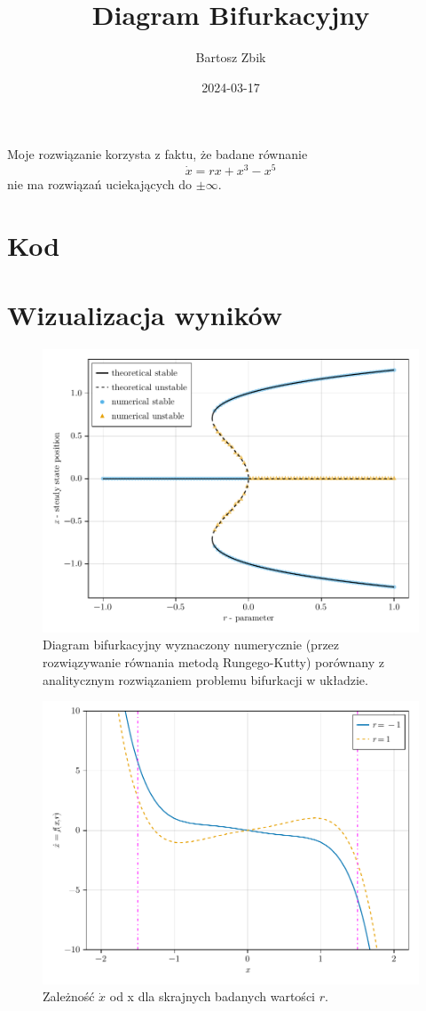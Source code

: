 \documentclass[12pt]{article}
\title{Diagram Bifurkacyjny}
\author{Bartosz Zbik}
\date{2024-03-17} %
\begin{document}
\maketitle %

\noindent Moje rozwiązanie korzysta z faktu, że badane równanie
\begin{equation}
\dot x = r x  + x^3 - x^5
\end{equation}
nie ma rozwiązań uciekających do $\pm \infty$. 

\section{Kod}



\section{Wizualizacja wyników}
\clearpage

\begin{figure}
\centering
\includegraphics[width=\textwidth]{bifurc-diagram}
\caption{Diagram bifurkacyjny wyznaczony numerycznie (przez rozwiązywanie równania metodą Rungego-Kutty) porównany z analitycznym rozwiązaniem problemu bifurkacji w układzie.}
\end{figure}

\begin{figure}
\centering
\includegraphics[width=\textwidth]{f-func}
\caption{Zależność $\dot{x}$ od x dla skrajnych badanych wartości $r$.}
\end{figure}
\end{document}
